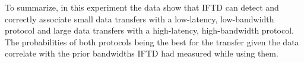 To summarize, in this experiment the data show that IFTD can detect and correctly associate small data transfers with a low-latency, low-bandwidth protocol and large data transfers with a high-latency, high-bandwidth protocol.  The probabilities of both protocols being the best for the transfer given the data correlate with the prior bandwidths IFTD had measured while using them.

